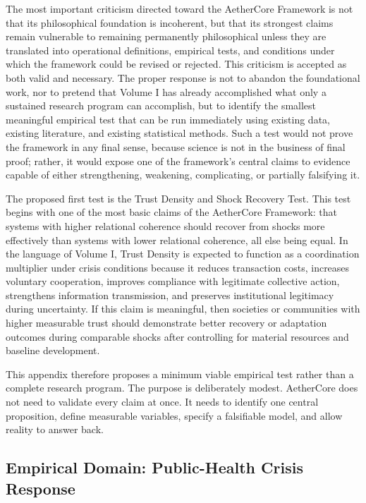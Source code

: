 \documentclass[12pt]{article}
\begin{document}
The most important criticism directed toward the AetherCore Framework is not that its philosophical foundation is incoherent, but that its strongest claims remain vulnerable to remaining permanently philosophical unless they are translated into operational definitions, empirical tests, and conditions under which the framework could be revised or rejected. This criticism is accepted as both valid and necessary. The proper response is not to abandon the foundational work, nor to pretend that Volume I has already accomplished what only a sustained research program can accomplish, but to identify the smallest meaningful empirical test that can be run immediately using existing data, existing literature, and existing statistical methods. Such a test would not prove the framework in any final sense, because science is not in the business of final proof; rather, it would expose one of the framework's central claims to evidence capable of either strengthening, weakening, complicating, or partially falsifying it.

The proposed first test is the Trust Density and Shock Recovery Test. This test begins with one of the most basic claims of the AetherCore Framework: that systems with higher relational coherence should recover from shocks more effectively than systems with lower relational coherence, all else being equal. In the language of Volume I, Trust Density is expected to function as a coordination multiplier under crisis conditions because it reduces transaction costs, increases voluntary cooperation, improves compliance with legitimate collective action, strengthens information transmission, and preserves institutional legitimacy during uncertainty. If this claim is meaningful, then societies or communities with higher measurable trust should demonstrate better recovery or adaptation outcomes during comparable shocks after controlling for material resources and baseline development.

This appendix therefore proposes a minimum viable empirical test rather than a complete research program. The purpose is deliberately modest. AetherCore does not need to validate every claim at once. It needs to identify one central proposition, define measurable variables, specify a falsifiable model, and allow reality to answer back.

\subsection{Empirical Domain: Public-Health Crisis Response}
\end{document}
